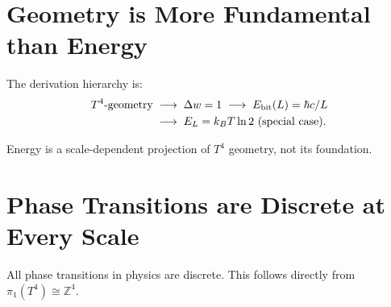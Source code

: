 \section{Geometry is More Fundamental than Energy}

The derivation hierarchy is:
\begin{align}
  T^4\text{-geometry} \;&\longrightarrow\;
  \Delta w = 1 \;\longrightarrow\;
  E_\text{bit}(L) = \hbar c / L \notag\\
  &\longrightarrow\;
  E_L = k_BT\ln 2 \text{ (special case)}.
\end{align}

Energy is a scale-dependent projection of \(T^4\) geometry,
not its foundation.

\begin{center}
\renewcommand{\arraystretch}{1.4}
\end{center}

\section{Phase Transitions are Discrete at Every Scale}

All phase transitions in physics are discrete.
This follows directly from \(\pi_1(T^4) \cong \mathbb{Z}^4\).

